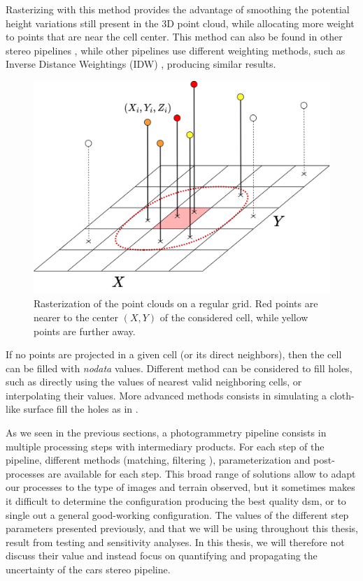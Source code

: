 Rasterizing with this method provides the advantage of smoothing the potential height variations still present in the 3D point cloud, while allocating more weight to points that are near the cell center. This method can also be found in other stereo pipelines \cite{shean_automated_2016}, while other pipelines use different weighting methods, such as Inverse Distance Weightings (IDW) \cite{rupnik_micmac_2017}, producing similar results.

\begin{figure}
    \centering
    \includegraphics[width=0.7\linewidth]{Images/Chap_1/Rasterization.png}
    \caption{Rasterization of the point clouds on a regular grid. Red points are nearer to the center $(X,Y)$ of the considered cell, while yellow points are further away.}
    \label{fig:rasterization}
\end{figure}

\begin{remark}
    If no points are projected in a given cell (or its direct neighbors), then the cell can be filled with \textit{nodata} values. Different method can be considered to fill holes, such as directly using the values of nearest valid neighboring cells, or interpolating their values. More advanced methods consists in simulating a cloth-like surface fill the holes as in \cite{lallement_bulldozer_2022}.
\end{remark}

As we seen in the previous sections, a photogrammetry pipeline consists in multiple processing steps with intermediary products. For each step of the pipeline, different methods (\eg matching, filtering \etc), parameterization and post-processes are available for each step. This broad range of solutions allow to adapt our processes to the type of images and terrain observed, but it sometimes makes it difficult to determine the configuration producing the best quality \acrshort{dsm}, or to single out a general good-working configuration. The values of the different step parameters presented previously, and that we will be using throughout this thesis, result from testing and sensitivity analyses. In this thesis, we will therefore not discuss their value and instead focus on quantifying and propagating the uncertainty of the \acrshort{cars} stereo pipeline.

